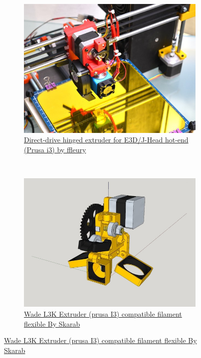 \documentclass[11pt,a4paper]{article}
\begin{document}
\begin{figure}[H]
    \centering
    \begin{subfigure}[b]{0.4\textwidth}
        \includegraphics[width=\textwidth,cfbox=azul_marcos 4pt 0pt]{FOTOS/EXTRUSOR1}
		\caption*{\href{http://www.thingiverse.com/thing:147705}{{\footnotesize Direct-drive hinged extruder for E3D/J-Head hot-end (Prusa i3) by ffleury}}}
    \end{subfigure}
    ~ \qquad%
    \begin{subfigure}[b]{0.4\textwidth}
        \includegraphics[width=\textwidth,cfbox=azul_marcos 4pt 0pt]{FOTOS/EXTRUSOR2}
		\caption*{\href{http://www.thingiverse.com/thing:512338}{{\footnotesize Wade L3K Extruder (prusa I3) compatible filament flexible By Skarab}}}
    \end{subfigure}
\end{figure}
\end{document}

